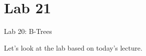 \documentclass[14pt,aspectratio=1610]{beamer}
\begin{document}
\section*{Lab 21}
\begin{frame}{Lab 20: B-Trees}
\begin{center}\Large
  Let's look at the lab based on today's lecture.
\end{center}
\end{frame}
\end{document}
